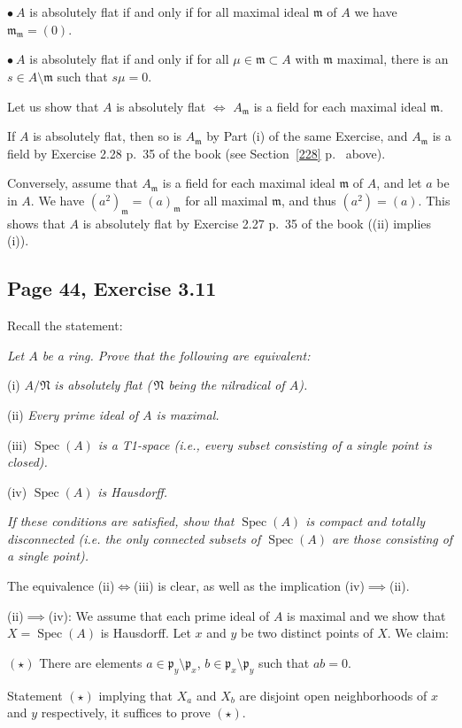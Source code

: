 \documentclass[parskip=half,fontsize=12pt]{scrartcl}%
\newcommand{\mf}{\mathfrak}
\newcommand{\mmm}{\mf m}
\newcommand{\ppp}{\mf p}
\newcommand{\bu}{\bullet}
\newcommand{\Spec}{\operatorname{Spec}}\newcommand{\Sp}{\operatorname{Spec}}
\begin{document}
$\bu\ A$ is absolutely flat if and only if for all maximal ideal $\mmm$ of $A$ we have $\mmm_\mmm=(0)$.

$\bu\ A$ is absolutely flat if and only if for all $\mu\in\mmm\subset A$ with $\mmm$ maximal, there is an $s\in A\setminus\mmm$ such that $s\mu=0$. 

Let us show that $A$ is absolutely flat $\iff$ $A_\mmm$ is a field for each maximal ideal $\mmm$. 

If $A$ is absolutely flat, then so is $A_\mmm$ by Part (i) of the same Exercise, and $A_\mmm$ is a field by Exercise 2.28 p.~35 of the book (see Section~\ref{228} p.~\pageref{228} above). 

Conversely, assume that $A_\mmm$ is a field for each maximal ideal $\mmm$ of $A$, and let $a$ be in $A$. We have $(a^2)_\mmm=(a)_\mmm$ for all maximal $\mmm$, and thus $(a^2)=(a)$. This shows that $A$ is absolutely flat by Exercise 2.27 p.~35 of the book ((ii) implies (i)).

\subsection{Page 44, Exercise 3.11}%

Recall the statement:

\emph{Let $A$ be a ring. Prove that the following are equivalent:}

(i) $A/\mf N$ \emph{is absolutely flat ($\,\mf N$ being the nilradical of $A$).}

(ii) \emph{Every prime ideal of $A$ is maximal.}

(iii)  $\Spec(A)$ \emph{is a T1-space (i.e., every subset consisting of a single point is closed).}

(iv) $\Spec(A)$ \emph{is Hausdorff.}

\emph{If these conditions are satisfied, show that $\Spec(A)$ is compact and totally disconnected (i.e. the only connected subsets of $\Spec(A)$ are those consisting of a single point).}

The equivalence (ii)$\iff$(iii) is clear, as well as the implication (iv)$\implies$(ii).

(ii)$\implies$(iv): We assume that each prime ideal of $A$ is maximal and we show that $X=\Spec(A)$ is Hausdorff. Let $x$ and $y$ be two distinct points of $X$. We claim:

$(\star)$ There are elements $a\in\ppp_y\setminus\ppp_x$, $b\in\ppp_x\setminus\ppp_y$ such that $ab=0$.

Statement $(\star)$ implying that $X_a$ and $X_b$ are disjoint open neighborhoods of $x$ and $y$ respectively, it suffices to prove $(\star)$.
\end{document}
